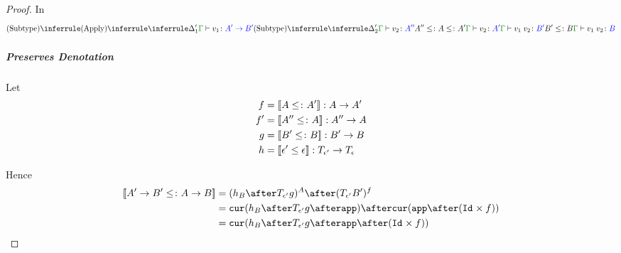 \documentclass{report}
\begin{document}
\begin{framed}
\begin{proof}
                In
                \begin{equation}
                    \ntreeruleII{Subtype}{
                        \ntreeruleII{Apply}{
                            \treeruleI{
                                \D'_1
                            }{
                                \gtyperelation{v_1}{\fntype{A'}{B'}}
                            }
                        }{
                            \ntreeruleII{Subtype}{
                                \treeruleI{\D'_2}{\gtyperelation{v_2}{A''}}
                                }{
                                A'' \subtype A \subtype A'
                            } {
                                \gtyperelation{v_2}{A'}
                            }
                        }{
                            \gtyperelation{\apply{v_1}{v_2}}{B'}
                        }
                        }{
                        B' \subtype B
                    }{
                        \gtyperelation{\apply{v_1}{v_2}}{B}
                    }
                \end{equation}
                \subparagraph{Preserves Denotation}
                    Let
                    \begin{align*}
                        f & = \deno{A\subtype A'}: A\rightarrow A' \\
                        f' & = \deno{A''\subtype A}: A'' \rightarrow A \\
                        g & = \deno{B' \subtype B}: B' \rightarrow B \\
                        h & = \deno{\e' \subeffect \e}: \T{\e'}{} \rightarrow \T{\e}{}
                    \end{align*}
        
                    Hence 
                    \begin{align*}
                        \deno{\fntype{A'}{B'}\subtype \ab} & = (h_B\after\T{\e'}{g})^A \after (\T{\e'}{B'})^f \\
                        & = \cur{h_B\after\T{\e'}{g}\after \app}\after\cur{\app\after(\Id{}\times f)}\\
                        & = \cur {h_B\after\T{\e'}{g}\after\app\after(\Id{}\times f)}
                    \end{align*}
        

\end{proof}
\end{framed}
\end{document}
